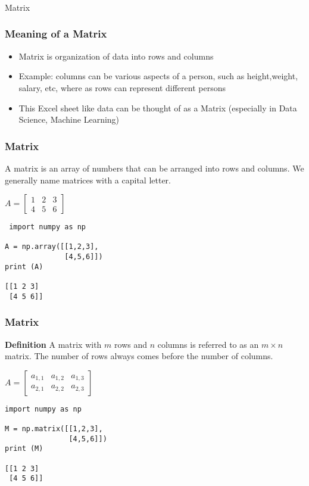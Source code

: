  \begin{frame}[fragile]\frametitle{}
\begin{center}
{\Large Matrix}
\end{center}
\end{frame}


\begin{frame}[fragile]\frametitle{Meaning of a Matrix}

 \begin{itemize}
  \item Matrix is organization of data into rows and columns
  \item Example: columns can be various aspects of a person, such as height,weight, salary, etc, where as rows can represent different persons 
  \item This Excel sheet like data can be thought of as a Matrix (especially in Data Science, Machine Learning)
 \end{itemize}

\end{frame}



 \begin{frame}[fragile] \frametitle{Matrix }
A matrix is an array of numbers that can be arranged into rows
and columns. We generally name matrices with a capital letter.

$A = \begin{bmatrix}
  1 & 2 & 3 \\
  4 & 5 & 6
 \end{bmatrix}$
 
\begin{lstlisting}
 import numpy as np

A = np.array([[1,2,3],
              [4,5,6]])
print (A)

[[1 2 3]
 [4 5 6]]
\end{lstlisting}


\end{frame}

  \begin{frame}[fragile]\frametitle{Matrix}
\textbf{Definition}
A matrix with $m$ rows and $n$ columns is referred to as an $m \times n$ matrix.
The number of rows always comes before the number of columns.

$A = \begin{bmatrix}
  a_{1,1} & a_{1,2} & a_{1,3} \\
  a_{2,1} & a_{2,2} & a_{2,3}
 \end{bmatrix}$
 
\begin{lstlisting}
import numpy as np

M = np.matrix([[1,2,3],
               [4,5,6]])
print (M)

[[1 2 3]
 [4 5 6]] 
\end{lstlisting}


\end{frame}



